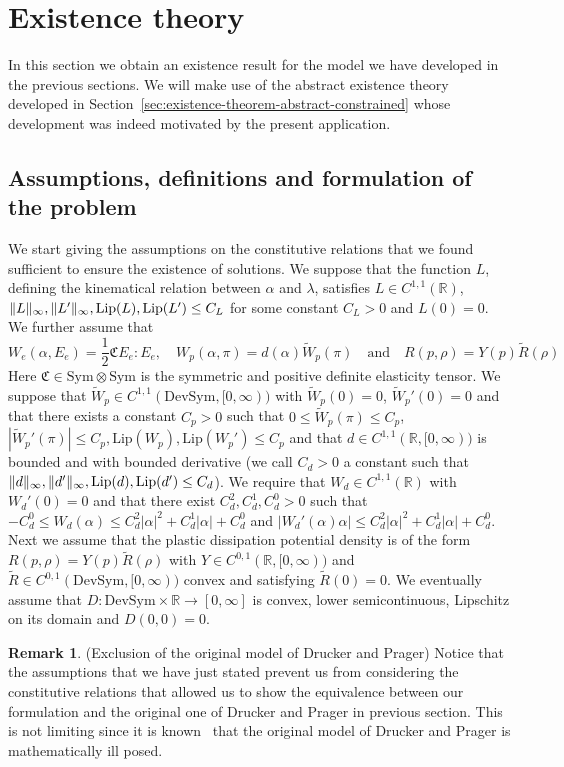 \documentclass[a4paper,10pt,oneside]{amsbook}
\numberwithin{section}{chapter}
\numberwithin{equation}{chapter}
\theoremstyle{definition}
\newtheorem{rmk}[prop]{Remark}
\DeclarePairedDelimiter{\norm}{\lVert}{\rVert}
\begin{document}
\section{Existence theory}
\label{sec:existence-small}

In this section we obtain an existence result for the model we have developed in the previous sections. We will make use of the abstract existence theory developed in Section~\ref{sec:existence-theorem-abstract-constrained} whose development was indeed motivated by the present application.

\subsection{Assumptions, definitions and formulation of the problem}

We start giving the assumptions on the constitutive relations that we found sufficient to ensure the existence of solutions. We suppose that the function $L$, defining the kinematical relation between $\alpha$ and $\lambda$, satisfies $L\in C^{1,1}(\mathbb{R})$, $\norm{L}_\infty,\norm{L'}_\infty,\text{Lip}(L),\text{Lip}(L')\le C_L$ for some constant $C_L>0$ and $L(0)=0$. We further assume that
\[
W_e(\alpha,E_e)=\frac{1}{2}\mathfrak{C}E_e:E_e,\quad W_p(\alpha,\pi)=d(\alpha)\tilde W_p(\pi)\quad\text{and}\quad R(p,\rho)=Y(p)\tilde R(\rho)
\]
Here $\mathfrak{C}\in\text{Sym}\otimes\text{Sym}$ is the symmetric and positive definite elasticity tensor. We suppose that $\tilde W_p\in C^{1,1}(\text{DevSym},[0,\infty))$ with $\tilde W_p(0)=0$, $\tilde W_p'(0)=0$ and that there exists a constant $C_p>0$ such that $0\le\tilde W_p(\pi)\le C_p$, $|\tilde W_p'(\pi)|\le C_p,\text{Lip}(W_p),\text{Lip}(W_p')\le C_p$ and that $d\in C^{1,1}(\mathbb{R},[0,\infty))$ is bounded and with bounded derivative (we call $C_d>0$ a constant such that $\norm{d}_\infty,\norm{d'}_\infty,\text{Lip}(d),\text{Lip}(d')\le C_d$). We require that $W_d\in C^{1,1}(\mathbb{R})$ with $W_d'(0)=0$ and that there exist $C_d^2,C_d^1,C_d^0>0$ such that $-C_d^0\le W_d(\alpha)\le C_d^2|\alpha|^2+C_d^1|\alpha|+C_d^0$ and $|W_d'(\alpha)\alpha|\le C_d^2|\alpha|^2+C_d^1|\alpha|+C_d^0$. Next we assume that the plastic dissipation potential density is of the form $R(p,\rho)=Y(p)\tilde R(\rho)$ with $Y\in C^{0,1}(\mathbb{R},[0,\infty))$ and $\tilde R\in C^{0,1}(\text{DevSym},[0,\infty))$ convex and satisfying $\tilde R(0)=0$. We eventually assume that $D\colon\text{DevSym}\times\mathbb{R}\to[0,\infty]$ is convex, lower semicontinuous, Lipschitz on its domain and $D(0,0)=0$.
\begin{rmk}(Exclusion of the original model of Drucker and Prager)
Notice that the assumptions that we have just stated prevent us from considering the constitutive relations that allowed us to show the equivalence between our formulation and the original one of Drucker and Prager in previous section. This is not limiting since it is known~\cite{morafrancfort} that the original model of Drucker and Prager is mathematically ill posed.
\end{rmk}
\end{document}
